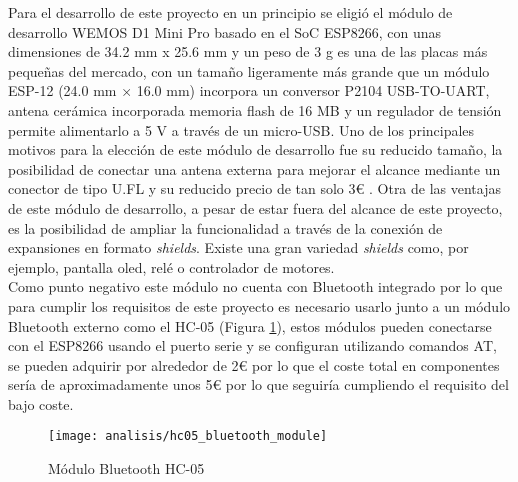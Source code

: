 \documentclass[../proyecto.tex]{subfiles}
\begin{document}
Para el desarrollo de este proyecto en un principio se eligió el módulo de desarrollo WEMOS D1 Mini Pro basado en el SoC ESP8266, con unas dimensiones de 34.2 mm x 25.6 mm y un peso de 3 g es una de las placas más pequeñas del mercado, con un tamaño ligeramente más grande que un módulo ESP-12 (24.0 mm × 16.0 mm) incorpora un conversor P2104 USB-TO-UART, antena cerámica incorporada memoria flash de 16 MB y un regulador de tensión permite alimentarlo a 5 V a través de un micro-USB. Uno de los principales motivos para la elección de este módulo de desarrollo fue su reducido tamaño, la posibilidad de conectar una antena externa para mejorar el alcance mediante un conector de tipo U.FL y su reducido precio de tan solo 3€ \cite{lolin_official_store}. Otra de las ventajas de este módulo de desarrollo, a pesar de estar fuera del alcance de este proyecto, es la posibilidad de ampliar la funcionalidad a través de la conexión de expansiones en formato \textit{shields}. Existe una gran variedad \textit{shields} como, por ejemplo, pantalla oled, relé o controlador de motores.\\

Como punto negativo este módulo no cuenta con Bluetooth integrado por lo que para cumplir los requisitos de este proyecto es necesario usarlo junto a un módulo Bluetooth externo como el HC-05 (Figura \ref{fig:hc05_bluetooth_module}), estos módulos pueden conectarse con el ESP8266 usando el puerto serie y se configuran utilizando comandos AT, se pueden adquirir por alrededor de 2€ por lo que el coste total en componentes sería de aproximadamente unos 5€ por lo que seguiría cumpliendo el requisito del bajo coste.

\begin{figure}[H]
\centering
\texttt{[image: analisis/hc05\_bluetooth\_module]}
\caption{Módulo Bluetooth HC-05}
\label{fig:hc05_bluetooth_module}
\end{figure}
\end{document}
